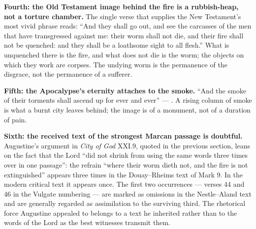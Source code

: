 \textbf{Fourth: the Old Testament image behind the fire is a rubbish-heap, not a torture chamber.} The single verse that supplies the New Testament's most vivid phrase reads: ``And they shall go out, and see the carcasses of the men that have transgressed against me: their worm shall not die, and their fire shall not be quenched: and they shall be a loathsome sight to all flesh.'' What is unquenched there is the fire, and what does not die is the worm; the objects on which they work are corpses. The undying worm is the permanence of the disgrace, not the permanence of a sufferer.

\textbf{Fifth: the Apocalypse's eternity attaches to the smoke.} ``And the smoke of their torments shall ascend up for ever and ever'' --- . A rising column of smoke is what a burnt city leaves behind; the image is of a monument, not of a duration of pain.

\textbf{Sixth: the received text of the strongest Marcan passage is doubtful.} Augustine's argument in \emph{City of God} XXI.9, quoted in the previous section, leans on the fact that the Lord ``did not shrink from using the same words three times over in one passage'': the refrain ``where their worm dieth not, and the fire is not extinguished'' appears three times in the Douay--Rheims text of Mark 9. In the modern critical text it appears once. The first two occurrences --- verses 44 and 46 in the Vulgate numbering --- are marked as omissions in the Nestle--Aland text and are generally regarded as assimilation to the surviving third. The rhetorical force Augustine appealed to belongs to a text he inherited rather than to the words of the Lord as the best witnesses transmit them.

